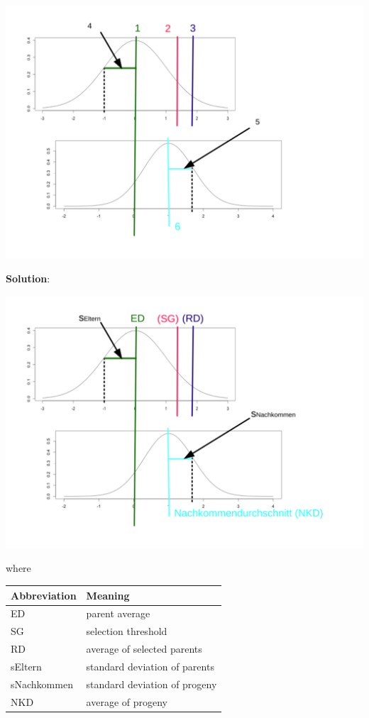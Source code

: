 \documentclass[]{article}
\newcommand{\sol}
{\vspace{2ex}\textbf{Solution}:}
\begin{document}
\begin{center}\includegraphics{png/GerichteteSelektionElternNk} \end{center}

\clearpage
\pagebreak

\sol

\begin{center}\includegraphics{png/GerichteteSelektionElternNkSol} \end{center}

where

\begin{longtable}[]{@{}ll@{}}
\toprule
Abbreviation & Meaning\tabularnewline
\midrule
\endhead
ED & parent average\tabularnewline
SG & selection threshold\tabularnewline
RD & average of selected parents\tabularnewline
sEltern & standard deviation of parents\tabularnewline
sNachkommen & standard deviation of progeny\tabularnewline
NKD & average of progeny\tabularnewline
\bottomrule
\end{longtable}
\end{document}
